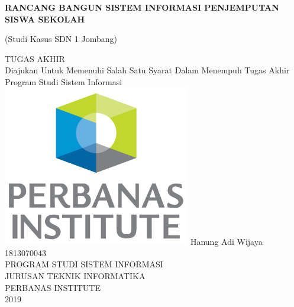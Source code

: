 \documentclass[a4paper, 12pt, oneside]{book}
\begin{document}

\begin{titlepage}
\begin{center}
\LARGE \textbf {RANCANG BANGUN SISTEM INFORMASI PENJEMPUTAN SISWA SEKOLAH}
\end{center}

\begin{center}
{\Large (Studi Kasus SDN 1 Jombang)}
\vspace{1cm}\\
\end{center}

\begin{center}
{\large TUGAS AKHIR}
\vspace{1cm}\\
\large{Diajukan Untuk Memenuhi Salah Satu Syarat Dalam Menempuh Tugas Akhir Program Studi Sistem Informasi}
\vfill
\includegraphics[height=7cm]{logo.png}
\vfill
{\large Hanung Adi Wijaya\\
1813070043}
\vspace{1cm}\\
\large{
PROGRAM STUDI SISTEM INFORMASI\\
JURUSAN TEKNIK INFORMATIKA\\
PERBANAS INSTITUTE\\
2019}
\end{center}

\end{titlepage}
\frontmatter
\end{document}
